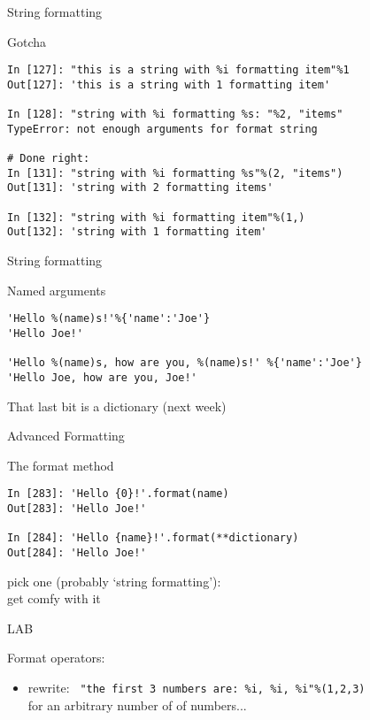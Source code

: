 \documentclass{beamer}
\begin{document}
\begin{frame}[fragile]{String formatting}

{\Large Gotcha}

\begin{verbatim}
In [127]: "this is a string with %i formatting item"%1 
Out[127]: 'this is a string with 1 formatting item'

In [128]: "string with %i formatting %s: "%2, "items" 
TypeError: not enough arguments for format string

# Done right:
In [131]: "string with %i formatting %s"%(2, "items")
Out[131]: 'string with 2 formatting items'

In [132]: "string with %i formatting item"%(1,)
Out[132]: 'string with 1 formatting item' 
\end{verbatim}

\end{frame}

\begin{frame}[fragile]{String formatting}

{\Large Named arguments}

\begin{verbatim}
'Hello %(name)s!'%{'name':'Joe'}
'Hello Joe!'

'Hello %(name)s, how are you, %(name)s!' %{'name':'Joe'}
'Hello Joe, how are you, Joe!'
\end{verbatim}
\vfill
{\Large That last bit is a dictionary (next week) }

\end{frame}

\begin{frame}[fragile]{Advanced Formatting}

{\Large The format method}

\begin{verbatim}
In [283]: 'Hello {0}!'.format(name)
Out[283]: 'Hello Joe!'

In [284]: 'Hello {name}!'.format(**dictionary)
Out[284]: 'Hello Joe!'
\end{verbatim}
\vfill
{\Large pick one (probably ‘string formatting’): \\
 get comfy with it }

\end{frame}


\begin{frame}[fragile]{LAB}

{\Large Format operators:}

\begin{itemize}
  \item rewrite: \verb| "the first 3 numbers are: %i, %i, %i"%(1,2,3)| \\
        for an arbitrary number of of numbers...

\end{itemize}

\end{frame}
\end{document}
